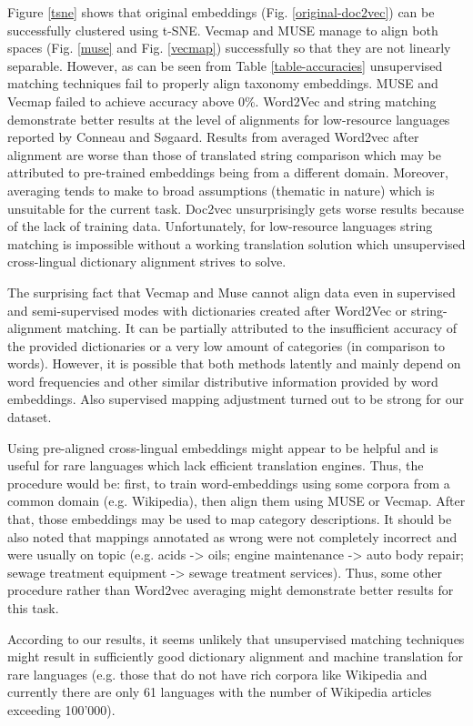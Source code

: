 \documentclass[conference]{IEEEtran}
\begin{document}
Figure \ref{tsne} shows that original embeddings (Fig. \ref{original-doc2vec}) can be successfully clustered using t-SNE. Vecmap and MUSE manage to align both spaces (Fig. \ref{muse} and Fig. \ref{vecmap}) successfully so that they are not linearly separable. However, as can be seen from Table \ref{table-accuracies} unsupervised matching techniques fail to properly align taxonomy embeddings. MUSE and Vecmap failed to achieve accuracy above 0\%. Word2Vec and string matching demonstrate better results at the level of alignments for low-resource languages reported by Conneau and Søgaard. Results from averaged Word2vec after alignment are worse than those of translated string comparison which may be attributed to pre-trained embeddings being from a different domain. Moreover, averaging tends to make to broad assumptions (thematic in nature) which is unsuitable for the current task. Doc2vec unsurprisingly gets worse results because of the lack of training data. Unfortunately, for low-resource languages string matching is impossible without a working translation solution which unsupervised cross-lingual dictionary alignment strives to solve.

The surprising fact that Vecmap and Muse cannot align data even in supervised and semi-supervised modes with dictionaries created after Word2Vec or string-alignment matching. It can be partially attributed to the insufficient accuracy of the provided dictionaries or a very low amount of categories (in comparison to words). However, it is possible that both methods latently and mainly depend on word frequencies and other similar distributive information provided by word embeddings. Also supervised mapping adjustment turned out to be strong for our dataset.

Using pre-aligned cross-lingual embeddings might appear to be helpful and is useful for rare languages which lack efficient translation engines. Thus, the procedure would be: first, to train word-embeddings using some corpora from a common domain (e.g. Wikipedia), then align them using MUSE or Vecmap. After that, those embeddings may be used to map category descriptions. It should be also noted that mappings annotated as wrong were not completely incorrect and were usually on topic (e.g. acids -> oils; engine maintenance -> auto body repair; sewage treatment equipment -> sewage treatment services). Thus, some other procedure rather than Word2vec averaging might demonstrate better results for this task.

According to our results, it seems unlikely that unsupervised matching techniques might result in sufficiently good dictionary alignment and machine translation for rare languages (e.g. those that do not have rich corpora like  Wikipedia and currently there are only 61 languages with the number of Wikipedia articles exceeding 100'000).
\end{document}
